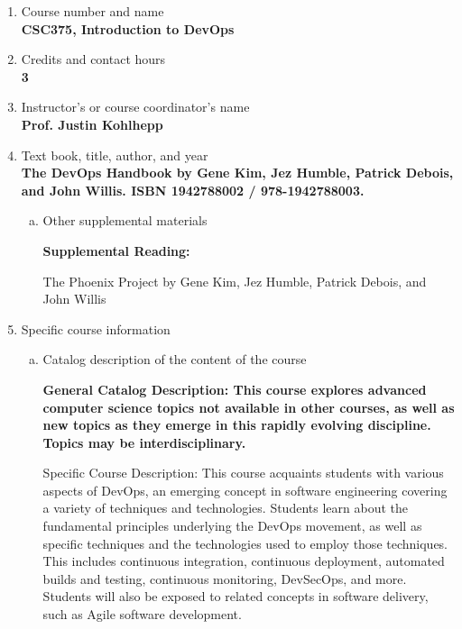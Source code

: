 \label{CSC375-DevOps}  %
\begin{enumerate}[1.]
\item Course number and name\\
  {\bfseries
    CSC375, Introduction to DevOps
  }

\item Credits and contact hours\\
  {\bfseries
    3
  }

\item Instructor's or course coordinator's name\\
  {\bfseries
    Prof. Justin Kohlhepp
  }

\item Text book, title, author, and year\\
  {\bfseries
    The DevOps Handbook by Gene Kim, Jez Humble, Patrick Debois, and John Willis. ISBN 1942788002 / 978-1942788003.
  }
\begin{enumerate}[a.]
\item Other supplemental materials\\
  {\bfseries
    Supplemental Reading:

    The Phoenix Project by Gene Kim, Jez Humble, Patrick Debois, and John Willis
  }
\end{enumerate}

\item Specific course information
\begin{enumerate}[a.]
\item Catalog description of the content of the course\\
  {\bfseries
General Catalog Description: This course explores advanced computer science topics not available in other courses, as well as new topics as they emerge in this rapidly evolving discipline. Topics may be interdisciplinary.

Specific Course Description: This course acquaints students with various aspects of DevOps, an emerging concept in software engineering covering a variety of techniques and technologies. Students learn about the fundamental principles underlying the DevOps movement, as well as specific techniques and the technologies used to employ those techniques.  This includes continuous integration, continuous deployment, automated builds and testing, continuous monitoring, DevSecOps, and more.  Students will also be exposed to related concepts in software delivery, such as Agile software development.
  }


\end{enumerate}
\end{enumerate}

